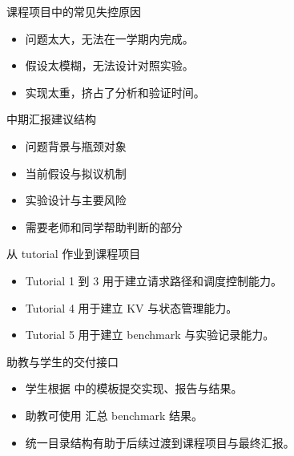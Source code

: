 \begin{frame}{课程项目中的常见失控原因}
  \begin{itemize}
    \item 问题太大，无法在一学期内完成。
    \item 假设太模糊，无法设计对照实验。
    \item 实现太重，挤占了分析和验证时间。
  \end{itemize}
\end{frame}

\begin{frame}{中期汇报建议结构}
  \begin{itemize}
    \item 问题背景与瓶颈对象
    \item 当前假设与拟议机制
    \item 实验设计与主要风险
    \item 需要老师和同学帮助判断的部分
  \end{itemize}
\end{frame}

\begin{frame}{从 tutorial 作业到课程项目}
  \begin{itemize}
    \item Tutorial 1 到 3 用于建立请求路径和调度控制能力。
    \item Tutorial 4 用于建立 KV 与状态管理能力。
    \item Tutorial 5 用于建立 benchmark 与实验记录能力。
  \end{itemize}
\end{frame}

\begin{frame}{助教与学生的交付接口}
  \begin{itemize}
    \item 学生根据 \texttt{} 中的模板提交实现、报告与结果。
    \item 助教可使用 \texttt{} 汇总 benchmark 结果。
    \item 统一目录结构有助于后续过渡到课程项目与最终汇报。
  \end{itemize}
\end{frame}

